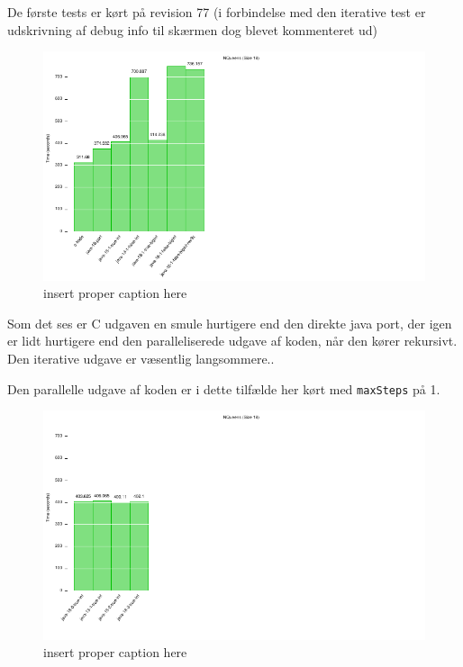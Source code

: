 De første tests er kørt på revision 77 (i forbindelse med den iterative test er
udskrivning af debug info til skærmen dog blevet kommenteret ud)

\begin{figure}[h]
\begin{center}
\includegraphics{../benchmarks/lokal.pdf}
\caption{insert proper caption here } 
\label{figur:lokal}
\end{center}
\end{figure}

Som det ses er C udgaven en smule hurtigere end den direkte java port, der igen
er lidt hurtigere end den paralleliserede udgave af koden, når den kører
rekursivt. Den iterative udgave er væsentlig langsommere..

Den parallelle udgave af koden er i dette tilfælde her kørt med
\texttt{maxSteps} på 1. 
\begin{figure}[h]
\begin{center}
\includegraphics{../benchmarks/maxsteps.pdf}
\caption{insert proper caption here } 
\label{figur:maxsteps}
\end{center}
\end{figure}

